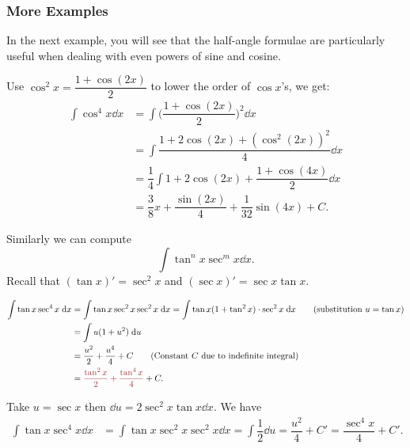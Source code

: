 \subsubsection{More Examples}
In the next example, you will see that the half-angle formulae are particularly useful when dealing with even powers of sine and cosine.
\begin{ex}
     \leavevmode
    Use $\cos^2 x = \dfrac{1 + \cos (2x)}{2}$ to lower the order of $\cos x$'s, we get: 
    \begin{align*}
        \int \cos^4 x \dd x &= \int \Big(\dfrac{1 + \cos (2x)}{2}\Big)^2 \dd x \\
        & =  \int \dfrac{1 + 2\cos(2x) + (\cos^2 (2x))^2}{4} \dd x \tag{pull the constant $1/4$ out}\\
        &= \dfrac{1}{4} \int 1 + 2\cos(2x) +  \dfrac{1+\cos(4x)}{2} \dd x \\
        &= \dfrac{3}{8} x + \dfrac{\sin(2x)}{4} + \dfrac{1}{32} \sin(4x) + C.
    \end{align*}
\end{ex}

Similarly we can compute  
\[\int \tan^n x \sec^m x \dd x.\]
Recall that $(\tan x)' = \sec^2 x$ and $(\sec x)' = \sec x \tan x$.

\begin{ex} \leavevmode
    \begin{align*}
        \int \tan x \sec^4 x \dd x &= \int \tan x \sec^2 x \sec^2 x \dd x = \int \tan x (1+\tan^2 x) \cdot \sec^2 x \dd x \tag{substitution $u = \tan x$}\\
        &= \int u(1 + u^2)\dd u\\
        &= \dfrac{u^2}{2} + \dfrac{u^4}{4} + C \tag{Constant $C$ due to indefinite integral} \\
        &= \red{\dfrac{\tan^2 x}{2} + \dfrac{\tan^4 x}{4}} + C.
    \end{align*}
\end{ex}



\begin{ex} \leavevmode Take $u = \sec x$ then $\dd u = 2 \sec^2 x \tan x \dd x$. We have
    \begin{align*}
        \int \tan x \sec^4 x \dd x &= \int \tan x \sec^2 x \sec^2 x \dd x = \int \dfrac{1}{2} \dd u =  \dfrac{u^2}{4} + C' = \dfrac{\sec^4 x}{4} + C'.
    \end{align*}
\end{ex}

